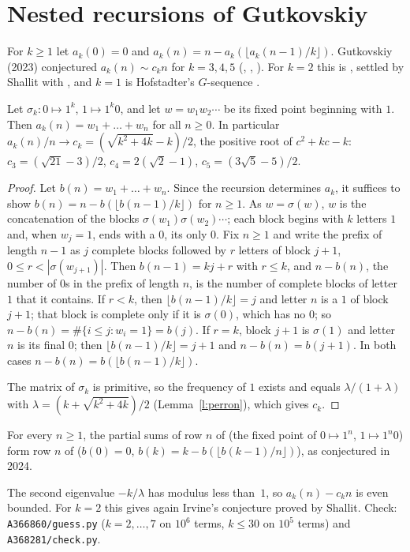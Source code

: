 \section{Nested recursions of Gutkovskiy}\label{s:A366860}
For $k\ge1$ let $a_k(0)=0$ and $a_k(n)=n-a_k(\lfloor a_k(n-1)/k\rfloor)$. Gutkovskiy (2023) conjectured
$a_k(n)\sim c_k n$ for $k=3,4,5$ (, , ). For $k=2$ this is
, settled by Shallit with \Walnut, and $k=1$ is Hofstadter's $G$-sequence .
\begin{theorem}\label{t:A366860} Let $\sigma_k:0\mapsto1^k$, $1\mapsto1^k0$, and let $w=w_1w_2\cdots$ be its
fixed point beginning with $1$. Then $a_k(n)=w_1+\dots+w_n$ for all $n\ge0$. In particular
$a_k(n)/n\to c_k=(\sqrt{k^2+4k}-k)/2$, the positive root of $c^2+kc-k$: $c_3=(\sqrt{21}-3)/2$,
$c_4=2(\sqrt2-1)$, $c_5=(3\sqrt5-5)/2$.\end{theorem}
\begin{proof} Let $b(n)=w_1+\dots+w_n$. Since the recursion determines $a_k$, it suffices to show
$b(n)=n-b(\lfloor b(n-1)/k\rfloor)$ for $n\ge1$. As $w=\sigma(w)$, $w$ is the concatenation of the blocks
$\sigma(w_1)\sigma(w_2)\cdots$; each block begins with $k$ letters $1$ and, when $w_j=1$, ends with a $0$, its only
$0$. Fix $n\ge1$ and write the prefix of length $n-1$ as $j$ complete blocks followed by $r$ letters of block
$j+1$, $0\le r<|\sigma(w_{j+1})|$. Then $b(n-1)=kj+r$ with $r\le k$, and $n-b(n)$, the number of $0$s in the
prefix of length $n$, is the number of complete blocks of letter $1$ that it contains. If $r<k$, then
$\lfloor b(n-1)/k\rfloor=j$ and letter $n$ is a $1$ of block $j+1$; that block is complete only if it is
$\sigma(0)$, which has no $0$; so $n-b(n)=\#\{i\le j:w_i=1\}=b(j)$. If $r=k$, block $j+1$ is $\sigma(1)$ and letter
$n$ is its final $0$; then $\lfloor b(n-1)/k\rfloor=j+1$ and $n-b(n)=b(j+1)$. In both cases
$n-b(n)=b(\lfloor b(n-1)/k\rfloor)$.

The matrix of $\sigma_k$ is primitive, so the frequency of $1$ exists and equals $\lambda/(1+\lambda)$ with
$\lambda=(k+\sqrt{k^2+4k})/2$ (Lemma~\ref{l:perron}), which gives $c_k$. \end{proof}
\begin{corollary} For every $n\ge1$, the partial sums of row $n$ of  (the fixed point of
$0\mapsto1^n$, $1\mapsto1^n0$) form row $n$ of  ($b(0)=0$, $b(k)=k-b(\lfloor b(k-1)/n\rfloor)$), as
conjectured in 2024.\end{corollary}
The second eigenvalue $-k/\lambda$ has modulus less than~$1$, so $a_k(n)-c_kn$ is even bounded. For $k=2$
this gives again Irvine's conjecture proved by Shallit. Check: \texttt{A366860/guess.py} ($k=2,\dots,7$ on
$10^6$ terms, $k\le30$ on $10^5$ terms) and \texttt{A368281/check.py}.

